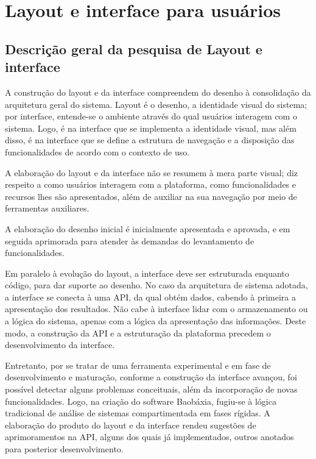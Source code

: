 \chapter{Layout e interface para usuários}\label{Layout e interface para usuários}\lhead{\leftmark}

\section{Descrição geral da pesquisa de Layout e interface}
A construção do layout e da interface compreendem do desenho à
consolidação da arquitetura geral do sistema. Layout é o desenho, a
identidade visual do sistema; por interface, entende-se o ambiente
através do qual usuários interagem com o sistema. Logo, é na
interface que se implementa a identidade visual, mas além disso, é
na interface que se define a estrutura de navegação e a disposição
das funcionalidades de acordo com o contexto de uso.

A elaboração do layout e da interface não se resumem à mera parte
visual; diz respeito a como usuários interagem com a plataforma,
como funcionalidades e recursos lhes são apresentados, além de
auxiliar na sua navegação por meio de ferramentas auxiliares.

A elaboração do desenho inicial é inicialmente apresentada e
aprovada, e em seguida aprimorada para atender às demandas do
levantamento de funcionalidades.

Em paralelo à evolução do layout, a interface deve ser estruturada
enquanto código, para dar suporte ao desenho. No caso da arquitetura
de sistema adotada, a interface se conecta à uma API, da qual
obtém dados, cabendo à primeira a apresentação dos resultados. Não
cabe à interface lidar com o armazenamento ou a lógica do sistema,
apenas com a lógica da apresentação das informações. Deste modo,
a construção da API e a estruturação da plataforma precedem o
desenvolvimento da interface.

Entretanto, por se tratar de uma ferramenta experimental e em fase
de desenvolvimento e maturação, conforme a construção da interface
avançou, foi possível detectar alguns problemas conceituais, além
da incorporação de novas funcionalidades. Logo, na criação do
software Baobáxia, fugiu-se à lógica tradicional de análise de
sistemas compartimentada em fases rígidas. A elaboração do produto
do layout e da interface rendeu sugestões de aprimoramentos na API,
alguns dos quais já implementados, outros anotados para posterior
desenvolvimento.

